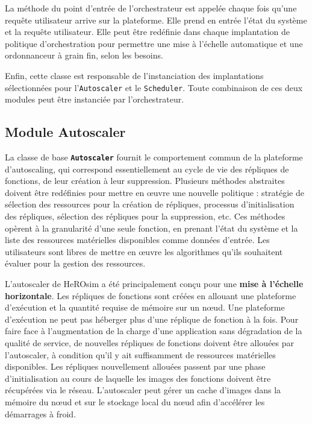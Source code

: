 La méthode du point d'entrée de l'orchestrateur est appelée chaque fois qu'une requête utilisateur arrive sur la plateforme. Elle prend en entrée l'état du système et la requête utilisateur. Elle peut être redéfinie dans chaque implantation de politique d'orchestration pour permettre une mise à l'échelle automatique et une ordonnanceur à grain fin, selon les besoins.

Enfin, cette classe est responsable de l'instanciation des implantations sélectionnées pour l'\texttt{Autoscaler} et le \texttt{Scheduler}. Toute combinaison de ces deux modules peut être instanciée par l'orchestrateur.

\subsection{Module Autoscaler}

La classe de base \textbf{\texttt{Autoscaler}} fournit le comportement commun de la plateforme d'autoscaling, qui correspond essentiellement au cycle de vie des répliques de fonctions, de leur création à leur suppression. Plusieurs méthodes abstraites doivent être redéfinies pour mettre en œuvre une nouvelle politique : stratégie de sélection des ressources pour la création de répliques, processus d'initialisation des répliques, sélection des répliques pour la suppression, etc. Ces méthodes opèrent à la granularité d'une seule fonction, en prenant l'état du système et la liste des ressources matérielles disponibles comme données d'entrée. Les utilisateurs sont libres de mettre en œuvre les algorithmes qu'ils souhaitent évaluer pour la gestion des ressources.

L'autoscaler de HeROsim a été principalement conçu pour une \textbf{mise à l'échelle horizontale}. Les répliques de fonctions sont créées en allouant une plateforme d'exécution et la quantité requise de mémoire sur un nœud. Une plateforme d'exécution ne peut pas héberger plus d'une réplique de fonction à la fois. Pour faire face à l'augmentation de la charge d'une application sans dégradation de la qualité de service, de nouvelles répliques de fonctions doivent être allouées par l'autoscaler, à condition qu'il y ait suffisamment de ressources matérielles disponibles. Les répliques nouvellement allouées passent par une phase d'initialisation au cours de laquelle les images des fonctions doivent être récupérées via le réseau. L'autoscaler peut gérer un cache d'images dans la mémoire du nœud et sur le stockage local du nœud afin d'accélérer les démarrages à froid.

